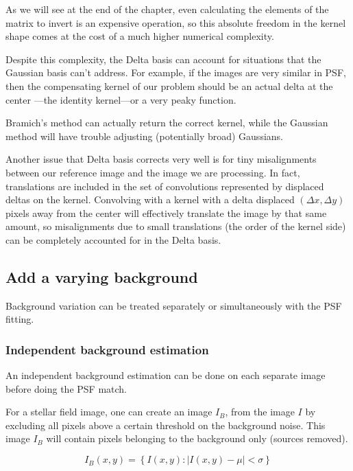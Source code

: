 As we will see at the end of the chapter, even calculating the elements of the matrix to invert is an expensive operation,
so this absolute freedom in the kernel shape comes at the cost of a much higher numerical complexity.

Despite this complexity, the Delta basis can account for situations that the Gaussian basis can't address.
For example, if the images are very similar in PSF, then the compensating kernel of our problem should be an actual delta at the center 
---the identity kernel---or a very peaky function.

Bramich's method can actually return the correct kernel, while the Gaussian method will have trouble adjusting (potentially broad) Gaussians.

Another issue that Delta basis corrects very well is for tiny misalignments between our reference image and the image we are processing.
In fact, translations are included in the set of convolutions represented by displaced deltas on the kernel.
Convolving with a kernel with a delta displaced $(\Delta x, \Delta y)$ pixels away from the center will effectively translate the image by that same amount,
so misalignments due to small translations (the order of the kernel side) can be completely accounted for in the Delta basis.

\subsection*{Add a varying background}

Background variation can be treated separately or simultaneously with the PSF fitting.

\subsubsection*{Independent background estimation}

An independent background estimation can be done on each separate image before doing the PSF match.

For a stellar field image, one can create an image $I_{B}$, from the image $I$ by excluding all pixels above a certain threshold on the background noise. This image $I_{B}$ will contain pixels belonging to the background only (sources removed).

\begin{equation}
I_{B}(x,y)  = \left\{ I(x,y) : |I(x,y) - \mu| < \sigma \right\}
\end{equation}

